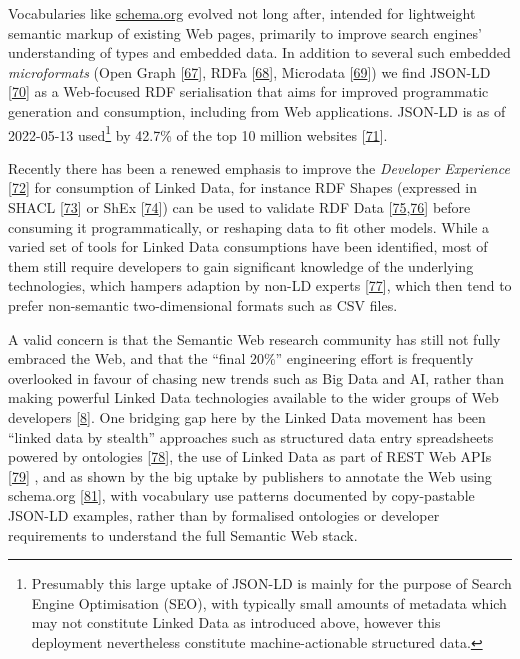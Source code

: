Vocabularies like \href{https://schema.org/}{schema.org} evolved not long after, intended for lightweight semantic markup of existing Web pages, primarily to improve search engines' understanding of types and embedded data. In addition to several such embedded \emph{microformats} (Open Graph {[}\protect\hyperlink{ref-oN9D5LkD}{67}{]}, RDFa {[}\protect\hyperlink{ref-FKIF6ApB}{68}{]}, Microdata {[}\protect\hyperlink{ref-14Utscfe4}{69}{]}) we find JSON-LD {[}\protect\hyperlink{ref-X5SWPqSU}{70}{]} as a Web-focused RDF serialisation that aims for improved programmatic generation and consumption, including from Web applications. JSON-LD is as of 2022-05-13 used\footnote{Presumably this large uptake of JSON-LD is mainly for the purpose of Search Engine Optimisation (SEO), with typically small amounts of metadata which may not constitute Linked Data as introduced above, however this deployment nevertheless constitute machine-actionable structured data.} by 42.7\% of the top 10 million websites {[}\protect\hyperlink{ref-j3SqQLBR}{71}{]}.

Recently there has been a renewed emphasis to improve the \emph{Developer Experience} {[}\protect\hyperlink{ref-BFMoe8FC}{72}{]} for consumption of Linked Data, for instance RDF Shapes (expressed in SHACL {[}\protect\hyperlink{ref-GDrm9dgX}{73}{]} or ShEx {[}\protect\hyperlink{ref-YUzogaV}{74}{]}) can be used to validate RDF Data {[}\protect\hyperlink{ref-S5BI6Mwx}{75},\protect\hyperlink{ref-ZeOAPNHa}{76}{]} before consuming it programmatically, or reshaping data to fit other models. While a varied set of tools for Linked Data consumptions have been identified, most of them still require developers to gain significant knowledge of the underlying technologies, which hampers adaption by non-LD experts {[}\protect\hyperlink{ref-o596f2JM}{77}{]}, which then tend to prefer non-semantic two-dimensional formats such as CSV files.

A valid concern is that the Semantic Web research community has still not fully embraced the Web, and that the ``final 20\%'' engineering effort is frequently overlooked in favour of chasing new trends such as Big Data and AI, rather than making powerful Linked Data technologies available to the wider groups of Web developers {[}\protect\hyperlink{ref-jHwttlTs}{8}{]}. One bridging gap here by the Linked Data movement has been ``linked data by stealth'' approaches such as structured data entry spreadsheets powered by ontologies {[}\protect\hyperlink{ref-MhsCt4P3}{78}{]}, the use of Linked Data as part of REST Web APIs {[}\protect\hyperlink{ref-eS6a6tlz}{79}{]} , and as shown by the big uptake by publishers to annotate the Web using schema.org {[}\protect\hyperlink{ref-117tX9MEG}{81}{]}, with vocabulary use patterns documented by copy-pastable JSON-LD examples, rather than by formalised ontologies or developer requirements to understand the full Semantic Web stack.

